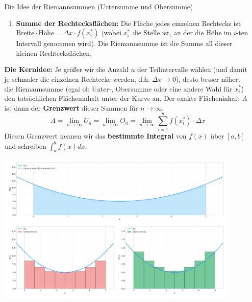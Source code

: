 \begin{merksatzumgebung}{Die Idee der Riemannsummen (Untersumme und Obersumme)}
\begin{enumerate}
\begin{itemize}
            \item \textbf{Riemannsumme mit linken/rechten Randpunkten oder Mittelpunkten:} Man kann als Höhe des $i$-ten Rechtecks auch einfach den Funktionswert am linken Rand $f(x_{i-1})$, am rechten Rand $f(x_i)$ oder in der Mitte des Teilintervalls $f(\frac{x_{i-1}+x_i}{2})$ wählen. Diese Summen nennt man dann allgemein Riemannsummen.
        \end{itemize}
    \item \textbf{Summe der Rechtecksflächen:} Die Fläche jedes einzelnen Rechtecks ist $\text{Breite} \cdot \text{Höhe} = \Delta x \cdot f(x_i^*)$ (wobei $x_i^*$ die Stelle ist, an der die Höhe im $i$-ten Intervall genommen wird). Die Riemannsumme ist die Summe all dieser kleinen Rechtecksflächen.
\end{enumerate}
\textbf{Die Kernidee:} Je größer wir die Anzahl $n$ der Teilintervalle wählen (und damit je schmaler die einzelnen Rechtecke werden, d.h. $\Delta x \to 0$), desto besser nähert die Riemannsumme (egal ob Unter-, Obersumme oder eine andere Wahl für $x_i^*$) den tatsächlichen Flächeninhalt unter der Kurve an. Der exakte Flächeninhalt $A$ ist dann der \textbf{Grenzwert} dieser Summen für $n \to \infty$.
\[ A = \lim_{n \to \infty} U_n = \lim_{n \to \infty} O_n = \lim_{n \to \infty} \sum_{i=1}^{n} f(x_i^*) \cdot \Delta x \]
Diesen Grenzwert nennen wir das \textbf{bestimmte Integral} von $f(x)$ über $[a,b]$ und schreiben $\int_a^b f(x) dx$.
\end{merksatzumgebung}

\begin{center}
    \includegraphics[width=0.9\textwidth]{grafiken/Riemannsummen_Untersumme_Obersumme.png}
    \label{fig:riemannsummen_illustration}
\end{center}

